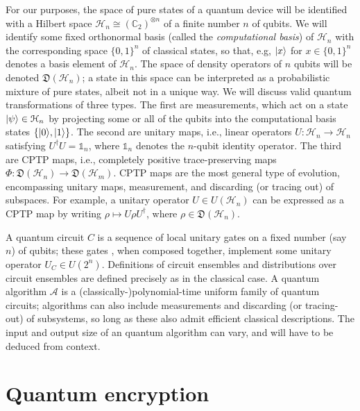 \documentclass[11pt]{article}
\numberwithin{equation}{section}
\newcommand{\one}{\mathds 1}
\newcommand{\C}{\mathbb{C}}
\newcommand{\states}{\mathfrak D}
\begin{document}
{For our purposes, the space of pure states of a quantum device will be identified with a Hilbert space $\mathcal H_n \cong (\C_2)^{\otimes n}$ of a finite number $n$ of qubits. We will identify some fixed orthonormal basis (called the \emph{computational basis}) of $\mathcal H_n$ with the corresponding space $\{0, 1\}^n$ of classical states, so that, e.g, ${\left\vert{x}\right\rangle}$ for $x \in \{0, 1\}^n$ denotes a basis element of $\mathcal H_n$. The space of density operators of $n$ qubits will be denoted $\states (\mathcal H_n)$; a state in this space can be interpreted as a probabilistic mixture of pure states, albeit not in a unique way. We will discuss valid quantum transformations of three types. The first are measurements, which act on a state ${\left\vert{\psi}\right\rangle} \in \mathcal H_n$ by projecting some or all of the qubits into the computational basis states $\{{\left\vert{0}\right\rangle}, {\left\vert{1}\right\rangle}\}$. The second are unitary maps, i.e., linear operators $U: \mathcal H_n \rightarrow \mathcal H_n$ satisfying $U^\dagger U = \one_n$, where $\one_n$ denotes the $n$-qubit identity operator. The third are CPTP maps, i.e., completely positive trace-preserving maps $\Phi : \states (\mathcal H_n) \rightarrow \states (\mathcal H_m)$. CPTP maps are the most general type of evolution, encompassing unitary maps, measurement, and discarding (or tracing out) of subspaces. For example, a unitary operator $U \in U(\mathcal H_n)$ can be expressed as a CPTP map by writing $\rho \mapsto U\rho U^\dagger$, where $\rho \in \states (\mathcal H_n)$.

A quantum circuit $C$ is a sequence of local unitary gates on a fixed number (say $n$) of qubits; these gates , when composed together, implement some unitary operator $U_C \in U(2^n)$. Definitions of circuit ensembles and distributions over circuit ensembles are defined precisely as in the classical case. A quantum algorithm $\mathcal A$ is a (classically-)polynomial-time uniform family of quantum circuits; algorithms can also include measurements and discarding (or tracing-out) of subsystems, so long as these also admit efficient classical descriptions. The input and output size of an quantum algorithm can vary, and will have to be deduced from context.

\section{Quantum encryption}\label{sec:encryption}

}
\end{document}
